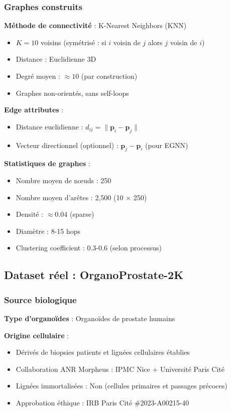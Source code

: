 \subsubsection{Graphes construits}

\textbf{Méthode de connectivité} : K-Nearest Neighbors (KNN)
\begin{itemize}
    \item $K = 10$ voisins (symétrisé : si $i$ voisin de $j$ alors $j$ voisin de $i$)
    \item Distance : Euclidienne 3D
    \item Degré moyen : $\approx 10$ (par construction)
    \item Graphes non-orientés, sans self-loops
\end{itemize}

\textbf{Edge attributes} :
\begin{itemize}
    \item Distance euclidienne : $d_{ij} = \|\mathbf{p}_i - \mathbf{p}_j\|$
    \item Vecteur directionnel (optionnel) : $\mathbf{p}_j - \mathbf{p}_i$ (pour EGNN)
\end{itemize}

\textbf{Statistiques de graphes} :
\begin{itemize}
    \item Nombre moyen de nœuds : 250
    \item Nombre moyen d'arêtes : 2,500 (10 × 250)
    \item Densité : $\approx 0.04$ (sparse)
    \item Diamètre : 8-15 hops
    \item Clustering coefficient : 0.3-0.6 (selon processus)
\end{itemize}

\subsection{Dataset réel : OrganoProstate-2K}

\subsubsection{Source biologique}

\textbf{Type d'organoïdes} : Organoïdes de prostate humains

\textbf{Origine cellulaire} :
\begin{itemize}
    \item Dérivés de biopsies patients et lignées cellulaires établies
    \item Collaboration ANR Morpheus : IPMC Nice + Université Paris Cité
    \item Lignées immortalisées : Non (cellules primaires et passages précoces)
    \item Approbation éthique : IRB Paris Cité \#2023-A00215-40
\end{itemize}

